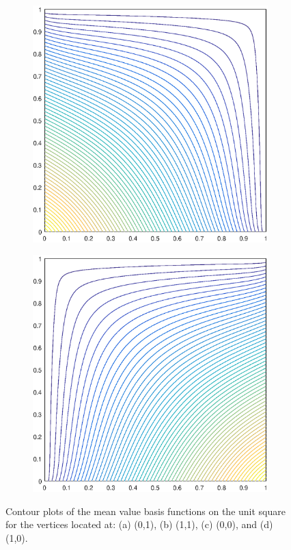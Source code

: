 \begin{figure}
\begin{subfigure}[b]{0.35\textwidth}
		\caption{}
	\end{subfigure}
	\vfill
	\begin{subfigure}[b]{0.35\textwidth}
		\centering
		\includegraphics[width=\textwidth]{figures/sec_BF/square_MV1_contour_b1.eps}
		\caption{}
	\end{subfigure}
	\hspace{1cm}
	\begin{subfigure}[b]{0.35\textwidth}
		\centering
		\includegraphics[width=\textwidth]{figures/sec_BF/square_MV1_contour_b2.eps}
		\caption{}
	\end{subfigure}
\caption{Contour plots of the mean value basis functions on the unit square for the vertices located at: (a) (0,1), (b) (1,1), (c) (0,0), and (d) (1,0).}
\end{figure}

